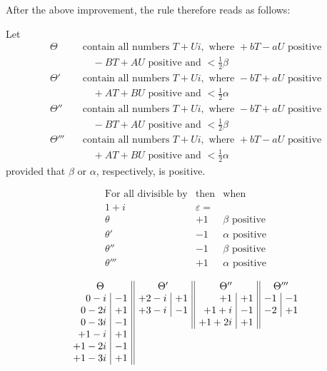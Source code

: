 After the above improvement, the rule therefore reads as follows:\par
Let
\[
\begin{aligned}
\Theta\quad&\text{contain all numbers }T+Ui,\text{ where }+bT-aU\text{ positive}\\
&\quad -BT+AU\text{ positive and }<\tfrac12\beta\\
\Theta'\quad&\text{contain all numbers }T+Ui,\text{ where }-bT+aU\text{ positive}\\
&\quad +AT+BU\text{ positive and }<\tfrac12\alpha\\
\Theta''\quad&\text{contain all numbers }T+Ui,\text{ where }-bT+aU\text{ positive}\\
&\quad -BT+AU\text{ positive and }<\tfrac12\beta\\
\Theta'''\quad&\text{contain all numbers }T+Ui,\text{ where }+bT-aU\text{ positive}\\
&\quad +AT+BU\text{ positive and }<\tfrac12\alpha
\end{aligned}
\]
provided that $\beta$ or $\alpha$, respectively, is positive.

\[
\begin{array}{c|c|l}
\text{For all divisible by}&\text{then}&\text{when}\\
1+i\text{}&\varepsilon=&\\
\theta&+1&\beta\text{ positive}\\
\theta'&-1&\alpha\text{ positive}\\
\theta''&-1&\beta\text{ positive}\\
\theta'''&+1&\alpha\text{ positive}
\end{array}
\]

\[
\setlength{\arraycolsep}{4pt}
\begin{array}{r|r||r|r||r|r||r|r}
\multicolumn{2}{c||}{\Theta}&\multicolumn{2}{c||}{\Theta'}&\multicolumn{2}{c||}{\Theta''}&\multicolumn{2}{c}{\Theta'''}\\
0-i&-1&+2-i&+1&+1&+1&-1&-1\\
0-2i&+1&+3-i&-1&+1+i&-1&-2&+1\\
0-3i&-1&\multicolumn{2}{c||}{}&+1+2i&+1&\multicolumn{2}{c}{}\\
+1-i&+1&\multicolumn{6}{c}{}\\
+1-2i&-1&\multicolumn{6}{c}{}\\
+1-3i&+1&\multicolumn{6}{c}{}
\end{array}
\]

\begin{center}
\resizebox{.86\textwidth}{!}{}
\end{center}
